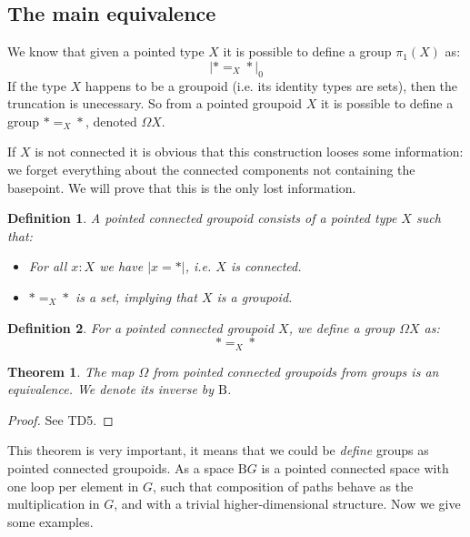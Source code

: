 \documentclass{article}
\newcommand{\sse}[1]{\medbreak \subsection{#1}}
\newcommand{\B}{\mathrm{B}}
\newtheorem{definition}{Definition}
\newtheorem{theorem}{Theorem}
\begin{document}
\sse{The main equivalence}

We know that given a pointed type $X$ it is possible to define a group $\pi_1(X)$ as: 
\[|*=_X*|_0\] If the type $X$ happens to be a groupoid (i.e. its identity types are sets), then the truncation is unecessary. So from a pointed groupoid $X$ it is possible to define a group $*=_X*$, denoted $\Omega X$. 

If $X$ is not connected it is obvious that this construction looses some information: we forget everything about the connected components not containing the basepoint. We will prove that this is the only lost information.

\begin{definition}
A pointed connected groupoid consists of a pointed type $X$ such that:
\begin{itemize}
\item For all $x:X$ we have $|x=*|$, i.e. $X$ is connected.
\item $*=_{X}*$ is a set, implying that $X$ is a groupoid.
\end{itemize}
\end{definition}

\begin{definition}
For a pointed connected groupoid $X$, we define a group $\Omega X$ as:
\[*=_X*\]
\end{definition}

\begin{theorem}
The map $\Omega$ from pointed connected groupoids from groups is an equivalence. We denote its inverse by $\B$.
\end{theorem}
\begin{proof}
See TD5.
\end{proof}

This theorem is very important, it means that we could be \emph{define} groups as pointed connected groupoids. As a space $\B G$ is a pointed connected space with one loop per element in $G$, such that composition of paths behave as the multiplication in $G$, and with a trivial higher-dimensional structure. Now we give some examples.
\end{document}
